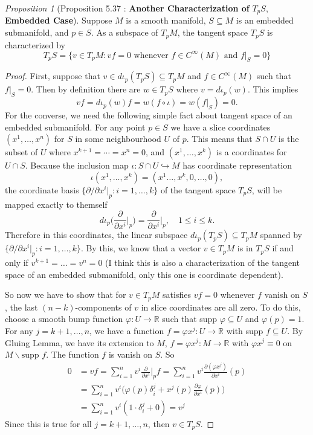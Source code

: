\documentclass[a4paper]{article}
\theoremstyle{remark}
\newtheorem{prop}{Proposition}
\newcommand{\er}{\mathbb{R}} %
\newcommand{\doo}{\partial}    %
\newcommand{\subhim}{\subseteq} %
\newcommand{\CM}{C^{\infty}(M)} %
\begin{document}
\begin{prop}[Proposition 5.37 : \textbf{Another Characterization of} \boldmath$T_pS$, \textbf{Embedded Case}]
Suppose $M$ is a smooth manifold, $S \subhim M$ is an embedded submanifold, and $p \in S$. As a subspace of $T_pM$, the tangent space $T_pS$ is characterized by
$$
T_pS = \{ v \in T_pM : vf=0 \text{ whenever } f \in \CM \text{ and } f|_S=0  \}
$$
\end{prop}
\begin{proof}
First, suppose that $v \in d\iota_p(T_pS) \subhim T_pM$ and $f \in \CM$ such that $f|_S=0$. Then by definition there are $w\in T_pS$ where $v = d\iota_p(w)$. This implies
$$
vf = d\iota_p(w)f = w(f \circ \iota)=w(f|_S) =0.
$$
For the converse, we need the following simple fact about tangent space of an embedded submanifold. For any point $p \in S$ we have a slice coordinates $(x^1,\dots,x^n)$ for $S$ in some neighbourhood $U$ of $p$. This means that $S\cap U$ is the subset of $U$ where $x^{k+1} = \cdots=x^n = 0$, and $(x^1,\dots,x^k)$ is a coordinates for $U \cap S$. Because the inclusion map $\iota : S\cap U \hookrightarrow M$ has coordinate representation
$$
\iota(x^1,\dots,x^k) = (x^1\dots,x^k,0,\dots,0),
$$
the coordinate basis $\{\doo/\doo x^i|_p : i=1,\dots,k\}$ of the tangent space $T_pS$, will be mapped exactly to themself
$$
d\iota_p\bigg(\frac{\doo}{\doo x^i}\bigg|_p\bigg) = \frac{\doo}{\doo x^i}\bigg|_p, \quad 1 \leq i \leq k.
$$ 
Therefore in this coordinates, the linear subspace $d\iota_p(T_pS) \subhim T_pM$ spanned by $\{\doo/\doo x^i|_p : i=1,\dots,k\}$. By this, we know that a vector $v \in T_pM$ is in $T_pS$ if and only if  $v^{k+1}=\dots = v^n = 0$ (I think this is also a characterization of the tangent space of an embedded submanifold, only this one is coordinate dependent). 

So now we have to show that for $v \in T_pM$ satisfies $vf=0$ whenever $f$ vanish on $S$, the last $(n-k)$-components of $v$ in slice coordinates are all zero. To do this, choose a smooth bump function $\varphi : U \to \er$ such that supp $ \varphi \subhim U$ and $\varphi (p) = 1$. For any $j=k+1,\dots,n$, we have a function $f = \varphi x^j : U \to \er$ with supp $f \subhim U$. By Gluing Lemma, we have its extension to $M$, $f = \varphi x^j : M \to \er$ with $\varphi x^j \equiv 0$ on $M \smallsetminus \text{supp }f$. The function $f$ is vanish on $S$. So
\begin{align*}
0&=vf =\sum_{i=1}^{n} v^i \frac{\doo}{\doo x^i}\bigg|_p f = \sum_{i=1}^{n} v^i \frac{\doo (\varphi x^j)}{\doo x^i} (p)\\ &= \sum_{i=1}^{n} v^i \bigg( \varphi(p) \delta^j_i + x^j(p) \frac{\doo \varphi }{\doo x^i} (p) \bigg) \\
&=  \sum_{i=1}^{n} v^i ( 1 \cdot \delta^j_i + 0) = v^j
\end{align*}
Since this is true for all $j=k+1,\dots,n$, then $v \in T_pS$.
\end{proof}
\end{document}
